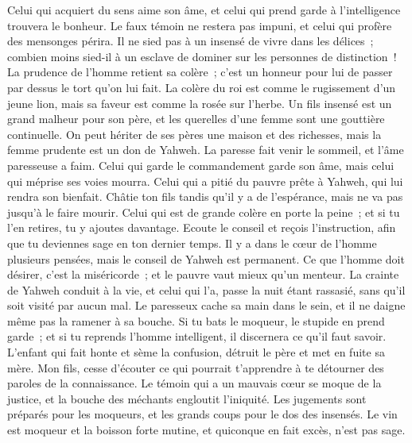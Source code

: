 \begin{multicols}{2}
Celui qui acquiert du sens aime son âme, et celui qui prend garde à l'intelligence trouvera le bonheur.
Le faux témoin ne restera pas impuni, et celui qui profère des mensonges périra.
Il ne sied pas à un insensé de vivre dans les délices~; combien moins sied-il à un esclave de dominer sur les personnes de distinction~!
La prudence de l'homme retient sa colère~; c'est un honneur pour lui de passer par dessus le tort qu'on lui fait.
La colère du roi est comme le rugissement d'un jeune lion, mais sa faveur est comme la rosée sur l'herbe.
Un fils insensé est un grand malheur pour son père, et les querelles d'une femme sont une gouttière continuelle.
On peut hériter de ses pères une maison et des richesses, mais la femme prudente est un don de Yahweh.
La paresse fait venir le sommeil, et l'âme paresseuse a faim.
Celui qui garde le commandement garde son âme, mais celui qui méprise ses voies mourra.
Celui qui a pitié du pauvre prête à Yahweh, qui lui rendra son bienfait.
Châtie ton fils tandis qu'il y a de l'espérance, mais ne va pas jusqu'à le faire mourir.
Celui qui est de grande colère en porte la peine~; et si tu l'en retires, tu y ajoutes davantage.
Ecoute le conseil et reçois l'instruction, afin que tu deviennes sage en ton dernier temps.
Il y a dans le cœur de l'homme plusieurs pensées, mais le conseil de Yahweh est permanent.
Ce que l'homme doit désirer, c'est la miséricorde~; et le pauvre vaut mieux qu'un menteur.
La crainte de Yahweh conduit à la vie, et celui qui l'a, passe la nuit étant rassasié, sans qu'il soit visité par aucun mal.
Le paresseux cache sa main dans le sein, et il ne daigne même pas la ramener à sa bouche.
Si tu bats le moqueur, le stupide en prend garde~; et si tu reprends l'homme intelligent, il discernera ce qu'il faut savoir.
L'enfant qui fait honte et sème la confusion, détruit le père et met en fuite sa mère.
Mon fils, cesse d'écouter ce qui pourrait t'apprendre à te détourner des paroles de la connaissance.
Le témoin qui a un mauvais cœur se moque de la justice, et la bouche des méchants engloutit l'iniquité.
Les jugements sont préparés pour les moqueurs, et les grands coups pour le dos des insensés.
\VerseOne{}Le vin est moqueur et la boisson forte mutine, et quiconque en fait excès, n'est pas sage.

\end{multicols}
